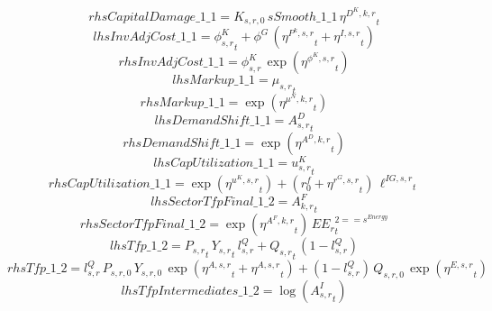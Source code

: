 \begin{dmath*}
rhsCapitalDamage\_1\_1 = {{K_{s,r,0}}}\, {sSmooth\_1\_1}\, {{\eta^{D^{K},k,r}}}_{t}
\end{dmath*}
\begin{dmath*}
lhsInvAdjCost\_1\_1 = {{\phi^K_{s,r}}}_{t}+{{\phi^{G}}}\, \left({{\eta^{P^k,s,r}}}_{t}+{{\eta^{I,s,r}}}_{t}\right)
\end{dmath*}
\begin{dmath*}
rhsInvAdjCost\_1\_1 = {{\phi^{K}_{s,r}}}\, \exp\left({{\eta^{\phi^{K},{s,r}}}}_{t}\right)
\end{dmath*}
\begin{dmath*}
lhsMarkup\_1\_1 = {{\mu_{s,r}}}_{t}
\end{dmath*}
\begin{dmath*}
rhsMarkup\_1\_1 = \exp\left({{\eta^{\mu^{N},k,r}}}_{t}\right)
\end{dmath*}
\begin{dmath*}
lhsDemandShift\_1\_1 = {{A^{D}_{s,r}}}_{t}
\end{dmath*}
\begin{dmath*}
rhsDemandShift\_1\_1 = \exp\left({{\eta^{A^{D},k,r}}}_{t}\right)
\end{dmath*}
\begin{dmath*}
lhsCapUtilization\_1\_1 = {{u^K_{s,r}}}_{t}
\end{dmath*}
\begin{dmath*}
rhsCapUtilization\_1\_1 = \exp\left({{\eta^{u^K,s,r}}}_{t}\right)+\left({{r^f_0}}+{{\eta^{r^G,s,r}}}_{t}\right)\, {{\ell^{IG,s,r}}}_{t}
\end{dmath*}
\begin{dmath*}
lhsSectorTfpFinal\_1\_2 = {{A^{F}_{k,r}}}_{t}
\end{dmath*}
\begin{dmath*}
rhsSectorTfpFinal\_1\_2 = \exp\left({{\eta^{A^F,k,r}}}_{t}\right)\, {{EE_r}}_{t}^{2=={{s^{Energy}}}}
\end{dmath*}
\begin{dmath*}
lhsTfp\_1\_2 = {{P_{s,r}}}_{t}\, {{Y_{s,r}}}_{t}\, {{l^{Q}_{s,r}}}+{{Q_{s,r}}}_{t}\, \left(1-{{l^{Q}_{s,r}}}\right)
\end{dmath*}
\begin{dmath*}
rhsTfp\_1\_2 = {{l^{Q}_{s,r}}}\, {{P_{s,r,0}}}\, {{Y_{s,r,0}}}\, \exp\left({{\eta^{A,s,r}}}_{t}+{{\eta^{A,s,r}}}_{t}\right)+\left(1-{{l^{Q}_{s,r}}}\right)\, {{Q_{s,r,0}}}\, \exp\left({{\eta^{E,s,r}}}_{t}\right)
\end{dmath*}
\begin{dmath*}
lhsTfpIntermediates\_1\_2 = \log\left({{A^{I}_{s,r}}}_{t}\right)
\end{dmath*}

